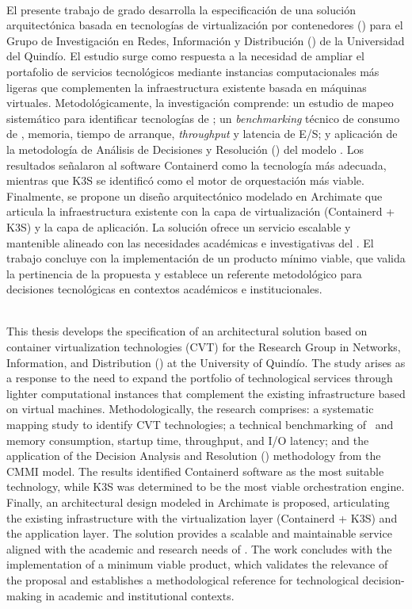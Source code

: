 \label{cap:resumen}
\mbox{}\\
El presente trabajo de grado desarrolla la especificación de una solución arquitectónica basada en tecnologías de virtualización por contenedores (\VBC) para el Grupo de Investigación en Redes, Información y Distribución (\GRID) de la Universidad del Quindío. El estudio surge como respuesta a la necesidad de ampliar el portafolio de servicios tecnológicos mediante instancias computacionales más ligeras que complementen la infraestructura existente basada en máquinas virtuales. 
Metodológicamente, la investigación comprende: un estudio de mapeo sistemático para identificar tecnologías de \VBC; un \textit{benchmarking} técnico de consumo de \CPU, memoria, tiempo de arranque, \textit{throughput} y latencia de E/S; y \@la aplicación de la metodología de Análisis de Decisiones y Resolución (\DAR) del modelo \CMMI. Los resultados señalaron al software Containerd como la tecnología más adecuada, mientras que K3S se identificó como el motor de orquestación más viable. 
Finalmente, se propone un diseño arquitectónico modelado en Archimate que articula la infraestructura existente con la capa de virtualización (Containerd + K3S) y la capa de aplicación. La solución ofrece un servicio escalable y mantenible alineado con las necesidades académicas e investigativas del \GRID. El trabajo concluye con la implementación de un producto mínimo viable, que valida la pertinencia de la propuesta y establece un referente metodológico para decisiones tecnológicas en contextos académicos e institucionales. 

\label{cap:abstract}
\mbox{}\\
This thesis develops the specification of an architectural solution based on container virtualization technologies (CVT) for the Research Group in Networks, Information, and Distribution (\GRID) at the University of Quindío. The study arises as a response to the need to expand the portfolio of technological services through lighter computational instances that complement the existing infrastructure based on virtual machines. Methodologically, the research comprises: a systematic mapping study to identify CVT technologies; a technical benchmarking of \CPU\ and memory consumption, startup time, throughput, and I/O latency; and the application of the Decision Analysis and Resolution (\DAR) methodology from the CMMI model. The results identified Containerd software as the most suitable technology, while K3S was determined to be the most viable orchestration engine. Finally, an architectural design modeled in Archimate is proposed, articulating the existing infrastructure with the virtualization layer (Containerd + K3S) and the application layer. The solution provides a scalable and maintainable service aligned with the academic and research needs of \GRID. The work concludes with the implementation of a minimum viable product, which validates the relevance of the proposal and establishes a methodological reference for technological decision-making in academic and institutional contexts.